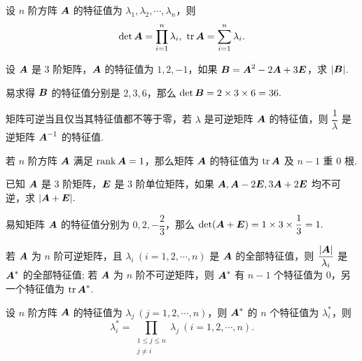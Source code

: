 \begin{theorem}[特征值的积与和]
    设 $n$ 阶方阵 $\vb*{A}$ 的特征值为 $\lambda_1,\lambda_2,\cdots,\lambda_n$，则 $$\displaystyle\det\vb*{A}=\prod_{i=1}^{n}\lambda_i,~\tr\vb*{A}=\sum_{i=1}^{n}\lambda_i.$$
\end{theorem}

\begin{example}
    设 $\vb*{A}$ 是 3 阶矩阵，$\vb*{A}$ 的特征值为 $1,2,-1$，如果 $\vb*{B}=\vb*{A}^2-2\vb*{A}+3\vb*{E}$，求 $|\vb*{B}|$.
\end{example}
\begin{solution}
    易求得 $\vb*{B}$ 的特征值分别是 $2,3,6$，那么 $\det\vb*{B}=2\times3\times6=36.$
\end{solution}

\begin{theorem}[逆矩阵的特征值]
    矩阵可逆当且仅当其特征值都不等于零，若 $\lambda$ 是可逆矩阵 $\vb*{A}$ 的特征值，则 $\dfrac{1}{\lambda}$ 是逆矩阵 $\vb*{A}^{-1}$ 的特征值.
\end{theorem}

\begin{theorem}[秩一矩阵的特征值]
    若 $n$ 阶方阵 $\vb*{A}$ 满足 $\rank\vb*{A}=1$，那么矩阵 $\vb*{A}$ 的特征值为 $\tr\vb*{A}$ 及 $n-1$ 重 0 根.
\end{theorem}

\begin{example}
    已知 $\vb*{A}$ 是 3 阶矩阵，$\vb*{E}$ 是 3 阶单位矩阵，如果 $\vb*{A},\vb*{A}-2\vb*{E},3\vb*{A}+2\vb*{E}$ 均不可逆，求 $|\vb*{A}+\vb*{E}|.$
\end{example}
\begin{solution}
    易知矩阵 $\vb*{A}$ 的特征值分别为 $0,2,-\dfrac{2}{3}$，那么 $\det(\vb*{A}+\vb*{E})=1\times3\times\dfrac{1}{3}=1.$
\end{solution}

\begin{theorem}[伴随矩阵的特征值 A]
    若 $\vb*{A}$ 为 $n$ 阶可逆矩阵，且 $\lambda_i~ (i=1,2,\cdots,n)$ 是 $\vb*{A}$ 的全部特征值，则 $\dfrac{|\vb*{A}|}{\lambda_i}$ 是 $\vb*{A}^*$ 的全部特征值; 
    若 $\vb*{A}$ 为 $n$ 阶不可逆矩阵，则 $\vb*{A}^*$ 有 $n-1$ 个特征值为 0，另一个特征值为 $\tr\vb*{A}^*.$
\end{theorem}

\begin{theorem}[伴随矩阵的特征值 B]
    \label{bsjzdtzzB}设 $n$ 阶方阵 $\vb*{A}$ 的特征值为 $\lambda_j~ (j=1,2,\cdots,n)$，则 $\vb*{A}^*$ 的 $n$ 个特征值为 $\lambda_i^*$，则
    $$\lambda_i^*=\prod_{\substack{1\leqslant j\leqslant n\\j\neq i}}\lambda_j~  (i=1,2,\cdots,n).$$
\end{theorem}

